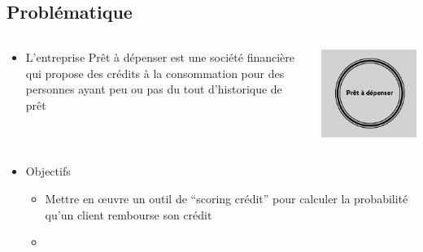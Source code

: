 \documentclass[8pt,aspectratio=169,hyperref={unicode=true}]{beamer}
\begin{document}
\subsection{Problématique}
\begin{frame}{\insertsubsection}
    \begin{columns}
        \begin{column}{.8\textwidth}
            \begin{itemize}
                \item L'entreprise Prêt à dépenser est une société financière qui propose des crédits à la consommation pour des personnes ayant peu ou pas du tout d'historique de prêt
            \end{itemize}
        \end{column}
        \begin{column}{.2\textwidth}
            \includegraphics[width=\textwidth]{./logoPAD.png}
        \end{column}
    \end{columns}
    \begin{itemize}
        \item Objectifs
              \begin{itemize}
                  \item Mettre en œuvre un outil de “scoring crédit” pour calculer la probabilité qu’un client rembourse son crédit
                  \item[]

\end{itemize}
\end{itemize}
\end{frame}
\end{document}
